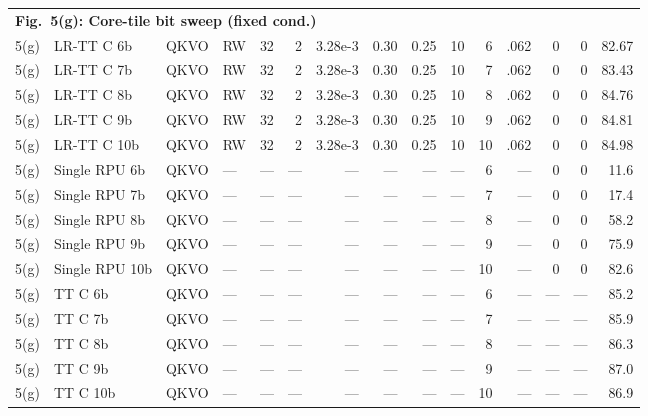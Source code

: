 \documentclass[AMA,LATO1COL]{WileyNJDv5}
\begin{document}
{\begin{longtable}{@{}l l l l r r r r r r r r r r r@{}}
\multicolumn{15}{l}{\cellcolor{HeadGray}\textbf{Fig.~5(g): Core-tile bit sweep (fixed cond.)}} \\
5(g) & LR-TT C 6b & QKVO & RW & 32 & 2 & 3.28e-3 & 0.30 & 0.25 & 10 & 6 & .062 & 0 & 0 & 82.67 \\
5(g) & LR-TT C 7b & QKVO & RW & 32 & 2 & 3.28e-3 & 0.30 & 0.25 & 10 & 7 & .062 & 0 & 0 & 83.43 \\
5(g) & LR-TT C 8b & QKVO & RW & 32 & 2 & 3.28e-3 & 0.30 & 0.25 & 10 & 8 & .062 & 0 & 0 & 84.76 \\
5(g) & LR-TT C 9b & QKVO & RW & 32 & 2 & 3.28e-3 & 0.30 & 0.25 & 10 & 9 & .062 & 0 & 0 & 84.81 \\
5(g) & LR-TT C 10b & QKVO & RW & 32 & 2 & 3.28e-3 & 0.30 & 0.25 & 10 & 10 & .062 & 0 & 0 & 84.98 \\
5(g) & Single RPU 6b & QKVO & --- & --- & --- & --- & --- & --- & --- & 6 & --- & 0 & 0 & 11.6 \\
5(g) & Single RPU 7b & QKVO & --- & --- & --- & --- & --- & --- & --- & 7 & --- & 0 & 0 & 17.4 \\
5(g) & Single RPU 8b & QKVO & --- & --- & --- & --- & --- & --- & --- & 8 & --- & 0 & 0 & 58.2 \\
5(g) & Single RPU 9b & QKVO & --- & --- & --- & --- & --- & --- & --- & 9 & --- & 0 & 0 & 75.9 \\
5(g) & Single RPU 10b & QKVO & --- & --- & --- & --- & --- & --- & --- & 10 & --- & 0 & 0 & 82.6 \\
5(g) & TT C 6b & QKVO & --- & --- & --- & --- & --- & --- & --- & 6 & --- & --- & --- & 85.2 \\
5(g) & TT C 7b & QKVO & --- & --- & --- & --- & --- & --- & --- & 7 & --- & --- & --- & 85.9 \\
5(g) & TT C 8b & QKVO & --- & --- & --- & --- & --- & --- & --- & 8 & --- & --- & --- & 86.3 \\
5(g) & TT C 9b & QKVO & --- & --- & --- & --- & --- & --- & --- & 9 & --- & --- & --- & 87.0 \\
5(g) & TT C 10b & QKVO & --- & --- & --- & --- & --- & --- & --- & 10 & --- & --- & --- & 86.9 \\
\midrule


\end{longtable}}
\end{document}

